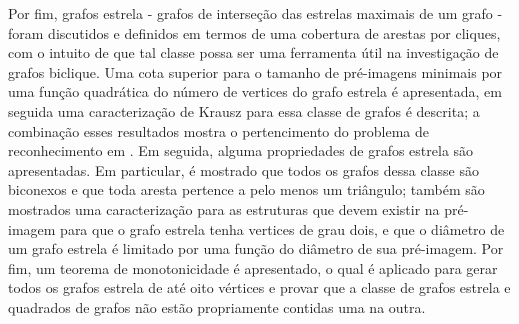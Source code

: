 Por fim, grafos estrela - grafos de interseção das estrelas maximais de um grafo - foram discutidos e definidos em termos de uma cobertura de arestas por cliques, com o intuito de que tal classe possa ser uma ferramenta útil na investigação de grafos biclique.
Uma cota superior para o tamanho de pré-imagens minimais por uma função quadrática do número de vertices do grafo estrela é apresentada, em seguida uma caracterização de Krausz para essa classe de grafos é descrita; a combinação esses resultados mostra o pertencimento do problema de reconhecimento em \NP.
Em seguida, alguma propriedades de grafos estrela são apresentadas.
Em particular, é mostrado que todos os grafos dessa classe são biconexos e que toda aresta pertence a pelo menos um triângulo; também são mostrados uma caracterização para as estruturas que devem existir na pré-imagem para que o grafo estrela tenha vertices de grau dois, e que o diâmetro de um grafo estrela é limitado por uma função do diâmetro de sua pré-imagem.
Por fim, um teorema de monotonicidade é apresentado, o qual é aplicado para gerar todos os grafos estrela de até oito vértices e provar que a classe de grafos estrela e quadrados de grafos não estão propriamente contidas uma na outra.